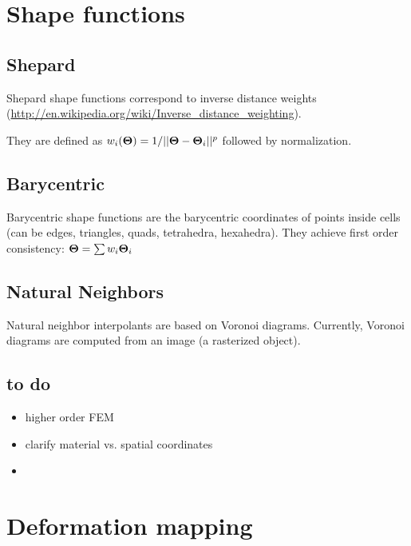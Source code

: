 \newpage
\section{Shape functions}

\subsection{Shepard}

Shepard shape functions correspond to inverse distance weights (\url{http://en.wikipedia.org/wiki/Inverse_distance_weighting}).

They are defined as $w_i(\mathbf{{\Theta}})=1/|| \mathbf{{\Theta}}-\mathbf{{\Theta}}_i ||^p$ followed by normalization.

\subsection{Barycentric}

Barycentric shape functions are the barycentric coordinates of points inside cells (can be edges, triangles, quads, tetrahedra, hexahedra).
They achieve first order consistency: $\mathbf{{\Theta}}= \sum w_i \mathbf{{\Theta}}_i$
 
\subsection{Natural Neighbors}

Natural neighbor interpolants are based on Voronoi diagrams.
Currently, Voronoi diagrams are computed from an image (a rasterized object).

\subsection{to do}

\begin{itemize}
 \item higher order FEM
 \item clarify material vs. spatial coordinates
 \item 
\end{itemize}

\newpage
\section{Deformation mapping}

